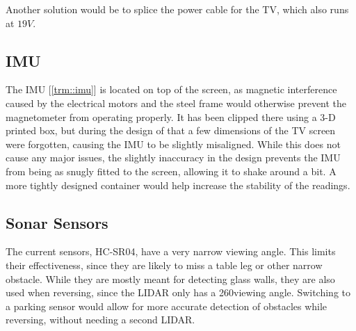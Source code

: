 Another solution would be to splice the power cable for the TV, which also runs at $19V$.


\subsection{IMU}
The IMU [\ref{trm::imu}] is located on top of the screen, as magnetic interference caused by the electrical motors and the steel frame would otherwise prevent the magnetometer from operating properly.
It has been clipped there using a 3-D printed box, but during the design of that a few dimensions of the TV screen were forgotten, causing the IMU to be slightly misaligned.
While this does not cause any major issues, the slightly inaccuracy in the design prevents the IMU from being as snugly fitted to the screen, allowing it to shake around a bit.
A more tightly designed container would help increase the stability of the readings.

\subsection{Sonar Sensors}
The current sensors, HC-SR04, have a very narrow viewing angle.
This limits their effectiveness, since they are likely to miss a table leg or other narrow obstacle.
While they are mostly meant for detecting glass walls, they are also used when reversing, since the LIDAR only has a 260\textdegree viewing angle.
Switching to a parking sensor would allow for more accurate detection of obstacles while reversing, without needing a second LIDAR.

\newpage
